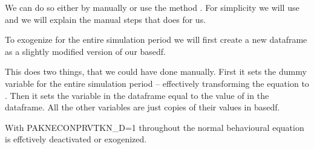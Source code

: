 \documentclass[letterpaper,10pt,english]{jupyterBook}
\begin{document}
\sphinxAtStartPar
We can do so either by manually or use the method . For simplicity we will use  and we will explain the manual steps that  does for us.

\sphinxAtStartPar
To exogenize  for the entire simulation period we will first create a new dataframe as a slightly modified version of our basedf.

\sphinxAtStartPar
{}

\sphinxAtStartPar
This does two things, that we could have done manually.  First it sets the dummy variable  for the entire simulation period – effectively transforming the equation to .  Then it sets the variable  in the  dataframe equal to the value of  in the  dataframe. All the other variables are  just copies of their values in basedf.

\sphinxAtStartPar
With PAKNECONPRVTKN\_D=1 throughout the normal behavioural equation is effctively de\sphinxhyphen{}activated or exogenized.
\end{document}
